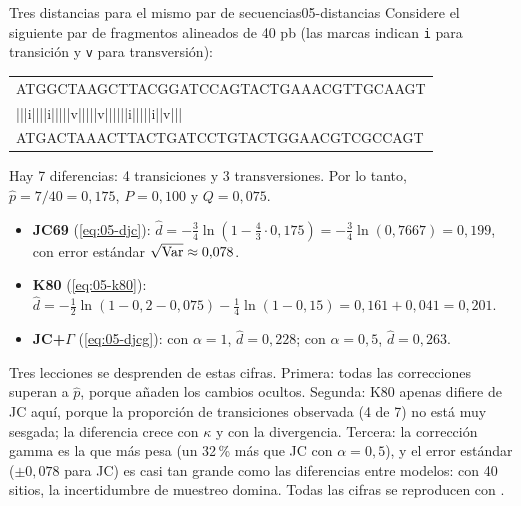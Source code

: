 \begin{ejemplo}{Tres distancias para el mismo par de secuencias}{05-distancias}
Considere el siguiente par de fragmentos alineados de 40 pb (las marcas indican \texttt{i} para transición y \texttt{v} para transversión):
\begin{center}
\ttfamily\small
\begin{tabular}{@{}l@{}}
ATGGCTAAGCTTACGGATCCAGTACTGAAACGTTGCAAGT\\
|||i||||i|||||v|||||v||||||i|||||i||v|||\\
ATGACTAAACTTACTGATCCTGTACTGGAACGTCGCCAGT
\end{tabular}
\end{center}
Hay 7 diferencias: 4 transiciones y 3 transversiones. Por lo tanto, $\hat p = 7/40 = 0{,}175$, $P=0{,}100$ y $Q=0{,}075$.
\begin{itemize}
  \item \textbf{JC69} (\cref{eq:05-djc}): $\hat d = -\tfrac34\ln(1-\tfrac43\cdot0{,}175) = -\tfrac34\ln(0{,}7667) = 0{,}199$, con error estándar $\sqrt{\operatorname{Var}}\approx 0{,}078$.
  \item \textbf{K80} (\cref{eq:05-k80}): $\hat d = -\tfrac12\ln(1-0{,}2-0{,}075) - \tfrac14\ln(1-0{,}15) = 0{,}161+0{,}041 = 0{,}201$.
  \item \textbf{JC+$\Gamma$} (\cref{eq:05-djcg}): con $\alpha=1$, $\hat d=0{,}228$; con $\alpha=0{,}5$, $\hat d = 0{,}263$.
\end{itemize}
Tres lecciones se desprenden de estas cifras. Primera: todas las correcciones superan a $\hat p$, porque añaden los cambios ocultos. Segunda: K80 apenas difiere de JC aquí, porque la proporción de transiciones observada (4 de 7) no está muy sesgada; la diferencia crece con $\kappa$ y con la divergencia. Tercera: la corrección gamma es la que más pesa (un 32\,\% más que JC con $\alpha=0{,}5$), y el error estándar ($\pm0{,}078$ para JC) es casi tan grande como las diferencias entre modelos: con 40 sitios, la incertidumbre de muestreo domina. Todas las cifras se reproducen con .
\end{ejemplo}

